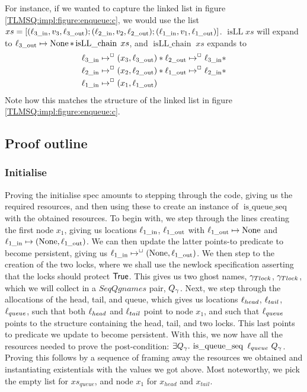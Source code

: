 \documentclass[twoside,11pt,openright]{report}
\newcommand{\isqueueseq}{\operatorname{is\_queue\_seq}}
\newcommand{\isLLchain}[1]{\operatorname{isLL\_chain} \; #1}
\newcommand{\isLL}{\operatorname{isLL}}
\newcommand{\locin}[1]{\loc_{#1\_\text{in}}}
\newcommand{\locout}[1]{\loc_{#1\_\text{out}}}
\begin{document}
For instance, if we wanted to capture the linked list in figure \ref{TLMSQ:impl:figure:enqueue:c}, we would use the list $xs = [(\locin{3}, v_3, \locout{3}); (\locin{2}, v_2, \locout{2});  (\locin{1}, v_1, \locout{1})]$. $\isLL{xs}$ will expand to $\locout{3} \mapsto \None \star \isLLchain{xs}$, and $\isLLchain{xs}$ expands to
\begin{align*}
  &\locin{3} \mapsto^{\persistently} (x_3, \locout{3}) \star \locout{2}	\mapsto^{\persistently} \locin{3}\star\\
  &\locin{2} \mapsto^{\persistently} (x_2, \locout{2}) \star \locout{1}\mapsto^{\persistently} \locin{2} \star\\
  &\locin{1} \mapsto^{\persistently} (x_1, \locout{1})
\end{align*}
Note how this matches the structure of the linked list in figure \ref{TLMSQ:impl:figure:enqueue:c}.

\subsection{Proof outline}

\subsubsection{Initialise}
Proving the initialise spec amounts to stepping through the code, giving us the required resources, and then using these to create an instance of $\isqueueseq$ with the obtained resources. To begin with, we step through the lines creating the first node $x_1$, giving us locations $\locin{1}$, $\locout{1}$ with $\locout{1} \mapsto \None$ and $\locin{1} \mapsto (\None, \locout{1})$. We can then update the latter points-to predicate to become persistent, giving us $\locin{1} \mapsto^{\persistently} (\None, \locout{1})$. We then step to the creation of the two locks, where we shall use the newlock specification asserting that the locks should protect $\textsf{True}$. This gives us two ghost names, $\gamma_{Tlock}$, $\gamma_{Tlock}$, which we will collect in a $SeqQgnames$ pair, $Q_\gamma$.
Next, we step through the allocations of the head, tail, and queue, which gives us locations $\ell_{head}$, $\ell_{tail}$, $\ell_{queue}$, such that both $\ell_{head}$ and $\ell_{tail}$ point to node $x_1$, and such that $\ell_{queue}$ points to the structure containing the head, tail, and two locks. This last points to predicate we update to become persistent.
With this, we now have all the resources needed to prove the post-condition: $\Exists Q_\gname . \isqueueseq \ \loc_{queue} \ Q_\gname$. Proving this follows by a sequence of framing away the resources we obtained and instantiating existentials with the values we got above. Most noteworthy, we pick the empty list for $xs_{queue}$, and node $x_1$ for $x_{head}$ and $x_{tail}$.
\end{document}
